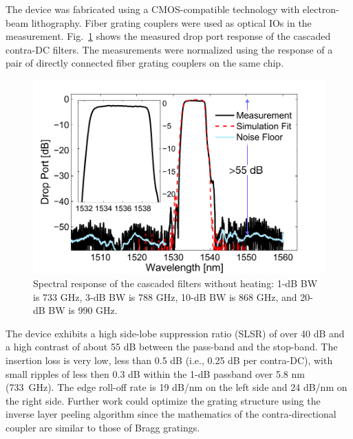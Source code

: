 \documentclass[osajnl,twocolumn,showpacs,superscriptaddress,10pt]{revtex4-1}
\begin{document}
The device was fabricated using a CMOS-compatible technology with electron-beam lithography. 
Fiber grating couplers\cite{zhong2014focusingFGC} were used as optical IOs in the measurement. 
Fig.~\ref{fig:passive} shows the measured drop port response of the cascaded contra-DC filters. 
The measurements were normalized using the response of a pair of directly connected fiber grating couplers on the same chip.
\begin{figure}[htbp]
\centering
\includegraphics[width=.99\columnwidth]{data/Passive6}
\caption{ Spectral response of the cascaded filters without heating: 1-dB BW is 733 GHz, 3-dB BW is 788 GHz, 10-dB BW is 868 GHz, and 20-dB BW is 990 GHz.}
\label{fig:passive}
\end{figure}

The device exhibits a high side-lobe suppression ratio (SLSR) of over 40 dB and a high contrast of about 55 dB between the pass-band and the stop-band. 
The insertion loss is very low, less than 0.5 dB (i.e., 0.25 dB per contra-DC), with small ripples of less then 0.3 dB within the 1-dB passband over 5.8 nm (733~GHz). 
The edge roll-off rate is 19 dB/nm on the left side and 24 dB/nm on the right side.
Further work could optimize the grating structure using the inverse layer peeling algorithm\cite{skaar2001synthesis} since the mathematics of the contra-directional coupler are similar to those of Bragg gratings.
\end{document}
